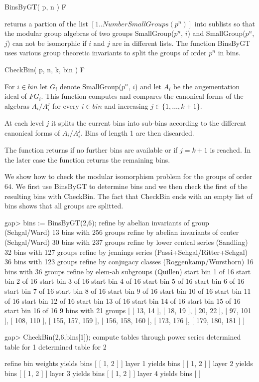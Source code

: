 \> BinsByGT( p, n ) F

returns a partion of the list $[1..NumberSmallGroups(p^n)]$ into 
sublists so that the modular group algebras of two groups 
SmallGroup($p^n$, $i$) and SmallGroup($p^n$, $j$) can not be
isomorphic if $i$ and $j$ are in different lists. The function
BinsByGT uses various group theoretic invariants to split the
groups of order $p^n$ in bins.

\> CheckBin( p, n, k, bin ) F

For $i \in bin$ let $G_i$ denote SmallGroup($p^n$, $i$) and let $A_i$
be the augementation ideal of $F G_i$. This function computes and
compares the canonical forms of the algebras $A_i / A_i^j$ for every
$i \in bin$ and increasing $j \in \{1, \ldots, k+1\}$. 

At each level $j$ it splits the current bins into sub-bins according 
to the different canonical forms of $A_i/A_i^j$. Bins of length 1 are 
then discarded.

The function returns if no further bins are available or if $j=k+1$ is
reached. In the later case the function returns the remaining bins. 


We show how to check the modular isomorphism problem for the groups
of order 64. We first use BinsByGT to determine bins and we then check
the first of the resulting bins with CheckBin. The fact that CheckBin
ends with an empty list of bins shows that all groups are splitted.

\beginexample
gap> bins := BinsByGT(2,6);
refine by abelian invariants of group (Sehgal/Ward) 
13 bins with 256 groups 
refine by abelian invariants of center (Sehgal/Ward) 
30 bins with 237 groups 
refine by lower central series (Sandling) 
32 bins with 127 groups 
refine by jennings series (Passi+Sehgal/Ritter+Sehgal) 
36 bins with 123 groups 
refine by conjugacy classes (Roggenkamp/Wursthorn) 
16 bins with 36 groups 
refine by elem-ab subgroups (Quillen) 
  start bin 1 of 16
  start bin 2 of 16
  start bin 3 of 16
  start bin 4 of 16
  start bin 5 of 16
  start bin 6 of 16
  start bin 7 of 16
  start bin 8 of 16
  start bin 9 of 16
  start bin 10 of 16
  start bin 11 of 16
  start bin 12 of 16
  start bin 13 of 16
  start bin 14 of 16
  start bin 15 of 16
  start bin 16 of 16
9 bins with 21 groups 
[ [ 13, 14 ], [ 18, 19 ], [ 20, 22 ], [ 97, 101 ], [ 108, 110 ], 
  [ 155, 157, 159 ], [ 156, 158, 160 ], [ 173, 176 ], [ 179, 180, 181 ] ]

gap> CheckBin(2,6,bins[1]);
compute tables through power series 
  determined table for 1
  determined table for 2

refine bin 
  weights yields bins [ [ 1, 2 ] ]
  layer 1 yields bins [ [ 1, 2 ] ]
  layer 2 yields bins [ [ 1, 2 ] ]
  layer 3 yields bins [ [ 1, 2 ] ]
  layer 4 yields bins [  ]
\endexample

